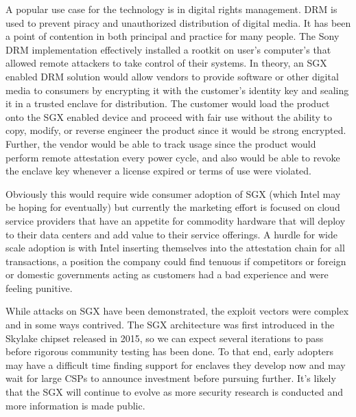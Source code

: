 A popular use case for the technology is in digital rights management. DRM is used to prevent piracy and unauthorized distribution of digital media. It has been a point of contention in both principal and practice for many people. The Sony DRM \cite{Sony_DRM} implementation effectively installed a rootkit on user's computer's that allowed remote attackers to take control of their systems. In theory, an SGX enabled DRM solution would allow vendors to provide software or other digital media to consumers by encrypting it with the customer's identity key and sealing it in a trusted enclave for distribution. The customer would load the product onto the SGX enabled device and proceed with fair use without the ability to copy, modify, or reverse engineer the product since it would be strong encrypted. Further, the vendor would be able to track usage since the product would perform remote attestation every power cycle, and also would be able to revoke the enclave key whenever a license expired or terms of use were violated. 

Obviously this would require wide consumer adoption of SGX (which Intel may be hoping for eventually) but currently the marketing effort is focused on cloud service providers that have an appetite for commodity hardware that will deploy to their data centers and add value to their service offerings. A hurdle for wide scale adoption is with Intel inserting themselves into the attestation chain for all transactions, a position the company could find tenuous if competitors or foreign or domestic governments acting as customers had a bad experience and were feeling punitive. 

While attacks on SGX have been demonstrated, the exploit vectors were complex and in some ways contrived. The SGX architecture was first introduced in the Skylake chipset released in 2015, so we can expect several iterations to pass before rigorous community testing has been done. To that end, early adopters may have a difficult time finding support for enclaves they develop now and may wait for large CSPs to announce investment before pursuing further. It's likely that the SGX will continue to evolve as more security research is conducted and more information is made public. 



